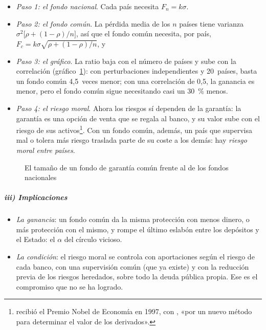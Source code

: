 \documentclass[11pt]{article}
\begin{document}
\begin{itemize}
\item \emph{Paso 1: el fondo nacional}. Cada país necesita $F_n=k\sigma$.
\item \emph{Paso 2: el fondo común}. La pérdida media de los $n$ países tiene varianza $\sigma^2\big[\rho+(1-\rho)/n\big]$, así que el fondo común necesita, por país, $F_c=k\sigma\sqrt{\rho+(1-\rho)/n}$, y
\item \emph{Paso 3: el gráfico}. La ratio baja con el número de países y sube con la correlación (gráfico~\ref{fig:seguro-comun}): con perturbaciones independientes y 20~países, basta un fondo común 4,5~veces menor; con una correlación de 0,5, la ganancia es menor, pero el fondo común sigue necesitando casi un 30~\% menos.
\item \emph{Paso 4: el riesgo moral}. Ahora los riesgos sí dependen de la garantía: la garantía es una opción de venta que se regala al banco, y su valor sube con el riesgo de sus activos\nocite{Merton1977Analytic}\footnote{ recibió el Premio Nobel de Economía en 1997, con , «por un nuevo método para determinar el valor de los derivados»\nocite{Nobel1997Prensa}.}. Con un fondo común, además, un país que supervisa mal o tolera más riesgo traslada parte de su coste a los demás: hay \emph{riesgo moral entre países}.
\end{itemize}

\begin{figure}[H]
\centering
\caption{El tamaño de un fondo de garantía común frente al de los fondos nacionales}\label{fig:seguro-comun}
\end{figure}

\subparagraph{iii) Implicaciones}

\begin{itemize}
\item \emph{La ganancia}: un fondo común da la misma protección con menos dinero, o más protección con el mismo, y rompe el último eslabón entre los depósitos y el Estado: el $\alpha$ del círculo vicioso.
\item \emph{La condición}: el riesgo moral se controla con aportaciones según el riesgo de cada banco, con una supervisión común (que ya existe) y con la reducción previa de los riesgos heredados, sobre todo la deuda pública propia. Ese es el compromiso que no se ha logrado.
\end{itemize}
\end{document}

